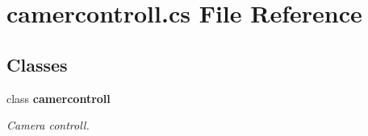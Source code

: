 \section{camercontroll.\+cs File Reference}
\label{camercontroll_8cs}
\subsection*{Classes}
\begin{DoxyCompactItemize}
\item 
class {\bf camercontroll}
\begin{DoxyCompactList}\small\item\em Camera controll. \end{DoxyCompactList}\end{DoxyCompactItemize}
